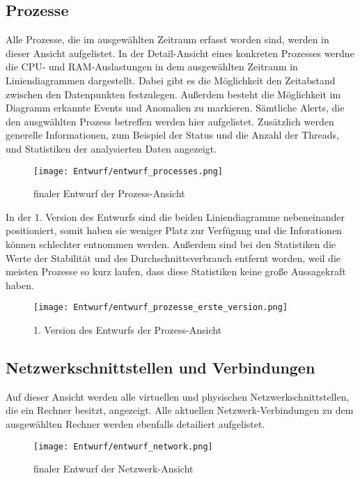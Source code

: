 \documentclass{report}
\begin{document}
\subsection{Prozesse}
Alle Prozesse, die im ausgewählten Zeitraum erfasst worden sind, werden in dieser Ansicht aufgelistet. In der Detail-Ansicht eines konkreten Prozesses werdne die CPU- und RAM-Auslastungen in dem ausgewählten Zeitraum in Liniendiagrammen dargestellt. Dabei gibt es die Möglichkeit den Zeitabstand zwischen den Datenpunkten festzulegen. Außerdem besteht die Möglichkeit im Diagramm erkannte Events und Anomalien zu markieren.
Sämtliche Alerts, die den ausgwählten Prozess betreffen werden hier aufgelistet.
Zusätzlich werden generelle Informationen, zum Beispiel der Status und die Anzahl der Threads, und Statistiken der analysierten Daten angezeigt.
\begin{figure}[H]
    \centering
    \texttt{[image: Entwurf/entwurf\_processes.png]}
    \caption{finaler Entwurf der Prozess-Ansicht}
\end{figure}
In der 1. Version des Entwurfs sind die beiden Liniendiagramme nebeneinander positioniert, somit haben sie weniger Platz zur Verfügung und die Inforationen können schlechter entnommen werden. Außerdem sind bei den Statistiken die Werte der Stabilität und des Durchschnittsverbrauch entfernt worden, weil die meisten Prozesse so kurz laufen, dass diese Statistiken keine große Aussagekraft haben.
\begin{figure}[H]
    \centering
    \texttt{[image: Entwurf/entwurf\_prozesse\_erste\_version.png]}
    \caption{1. Version des Entwurfs der Prozess-Ansicht}
\end{figure}

\subsection{Netzwerkschnittstellen und Verbindungen}
Auf dieser Ansicht werden alle virtuellen und physischen Netzwerkschnittstellen, die ein Rechner besitzt, angezeigt. Alle aktuellen Netzwerk-Verbindungen zu dem ausgewählten Rechner werden ebenfalls detailiert aufgelistet.
\begin{figure}[H]
    \centering
    \texttt{[image: Entwurf/entwurf\_network.png]}
    \caption{finaler Entwurf der Netzwerk-Ansicht}
\end{figure}
\end{document}
